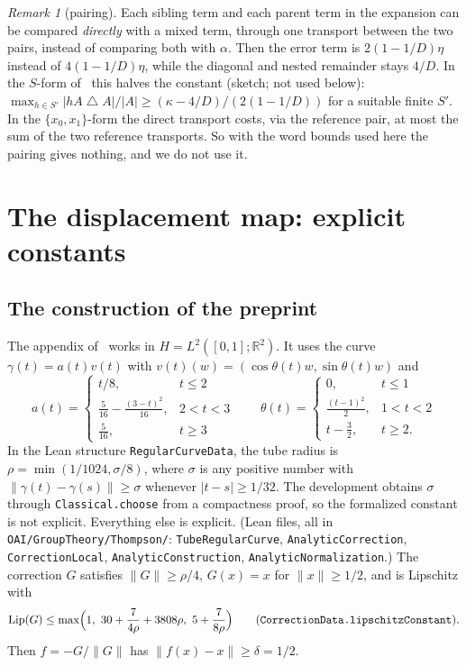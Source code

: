 \documentclass[11pt]{article}
\theoremstyle{definition}
\theoremstyle{remark}
\newtheorem{remark}[theorem]{Remark}
\newcommand{\norm}[1]{\lVert #1\rVert}
\newcommand{\R}{\mathbb{R}}
\newcommand{\Lip}{\operatorname{Lip}}
\newcommand{\sd}{\mathbin{\triangle}}
\begin{document}
\begin{remark}[pairing]\label{rem:pairing}
Each sibling term and each parent term in the expansion can be compared \emph{directly} with a
mixed term, through one transport between the two pairs, instead of comparing both with $\alpha$.
Then the error term is $2(1-1/D)\eta$ instead of $4(1-1/D)\eta$, while the diagonal and nested
remainder stays $4/D$. In the $S$-form of~\cite{OAI} this halves the constant (sketch; not used below):
$\max_{h\in S'}|hA\sd A|/|A|\ge(\kappa-4/D)/(2(1-1/D))$ for a suitable finite $S'$. In the
$\{x_0,x_1\}$-form the direct transport costs, via the reference pair, at most the sum of the two
reference transports. So with the word bounds used here the pairing gives nothing, and we do not
use it.
\end{remark}

\section{The displacement map: explicit constants}\label{sec:map}

\subsection{The construction of the preprint}
The appendix of~\cite{OAI} works in $H=L^2([0,1];\R^2)$. It uses the curve
$\gamma(t)=a(t)v(t)$ with $v(t)(w)=(\cos\theta(t)w,\sin\theta(t)w)$ and
\[
 a(t)=\begin{cases}t/8,&t\le2\\ \frac5{16}-\frac{(3-t)^2}{16},&2<t<3\\ \frac5{16},&t\ge3\end{cases}
 \qquad
 \theta(t)=\begin{cases}0,&t\le1\\ \frac{(t-1)^2}2,&1<t<2\\ t-\frac32,&t\ge2.\end{cases}
\]
In the Lean structure \texttt{RegularCurveData}, the tube radius is
$\rho=\min(1/1024,\sigma/8)$, where $\sigma$ is any positive number with
$\norm{\gamma(t)-\gamma(s)}\ge\sigma$ whenever $|t-s|\ge1/32$. The development obtains $\sigma$
through \texttt{Classical.choose} from a compactness proof, so the formalized constant is not
explicit. Everything else is explicit. (Lean files, all in \texttt{OAI/GroupTheory/Thompson/}:
\texttt{TubeRegularCurve}, \texttt{AnalyticCorrection}, \texttt{CorrectionLocal},
\texttt{AnalyticConstruction}, \texttt{AnalyticNormalization}.) The correction $G$ satisfies $\norm{G}\ge\rho/4$, $G(x)=x$
for $\norm x\ge1/2$, and is Lipschitz with
\[
 \Lip(G)\le\max\Bigl(1,\ 30+\frac7{4\rho}+3808\rho,\ 5+\frac7{8\rho}\Bigr)
 \qquad(\texttt{CorrectionData.lipschitzConstant}).
\]
Then $f=-G/\norm G$ has $\norm{f(x)-x}\ge\delta=1/2$.
\end{document}
